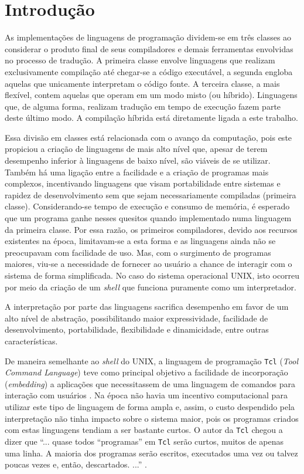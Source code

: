 \chapter{Introdução}

As implementações de linguagens de programação dividem-se em três
classes ao
considerar o produto final de seus compiladores e demais
ferramentas envolvidas no processo de tradução. A primeira classe
envolve linguagens que realizam exclusivamente compilação até
chegar-se a código executável, a segunda engloba aquelas que
unicamente interpretam o código fonte. A terceira classe, a mais
flexível, contem aquelas que operam em um modo misto (ou híbrido).
Linguagens que, de alguma forma,
realizam tradução em tempo de execução fazem parte deste último modo.
A compilação híbrida está diretamente ligada a este
trabalho.

Essa divisão em classes está relacionada com o avanço da computação,
pois este propiciou
a criação de linguagens de mais alto nível que, apesar de
terem desempenho inferior à linguagens de baixo nível,
são viáveis de se utilizar. Também há uma ligação entre a facilidade e a
criação de programas mais complexos, incentivando linguagens que visam
portabilidade entre sistemas e rapidez de desenvolvimento sem
que sejam necessariamente compiladas (primeira classe).
Considerando-se tempo de execução e
consumo de memória, é esperado que um programa ganhe
nesses quesitos quando implementado numa linguagem da primeira
classe. Por essa razão, os primeiros compiladores,
devido aos recursos existentes na época, limitavam-se a esta
forma e as linguagens ainda não se preocupavam com facilidade de uso.
Mas, com o surgimento de programas maiores, viu-se a necessidade de
fornecer ao usuário a chance de interagir com o sistema de forma
simplificada. %
No caso do
sistema operacional UNIX, isto ocorreu por meio da criação de
um \textit{shell} que funciona puramente como um interpretador.

A interpretação por parte das linguagens sacrifica desempenho em
favor de um alto nível de abstração, possibilitando maior
expressividade, facilidade de
desenvolvimento, portabilidade, flexibilidade e dinamicidade, entre
outras características.

De maneira semelhante ao \textit{shell} do UNIX,
a linguagem de programação \texttt{Tcl} (\textit{Tool Command Language})
teve como principal objetivo a
facilidade de incorporação (\textit{embedding}) a aplicações que
necessitassem de uma linguagem de comandos para
interação com usuários \cite{ousterhout_89} .
Na época não havia um
incentivo computacional para utilizar este tipo de linguagem de forma
ampla e, assim, o custo despendido pela interpretação não tinha
impacto sobre o sistema maior, pois os programas criados com estas linguagens
tendiam a ser bastante curtos. O autor da \texttt{Tcl} chegou a dizer
que ``... quase todos ``programas'' em \texttt{Tcl} serão curtos,
muitos de apenas uma linha. A maioria dos programas serão escritos,
executados uma vez ou talvez poucas vezes e, então,
descartados. ...'' \cite{ousterhout_89}.


